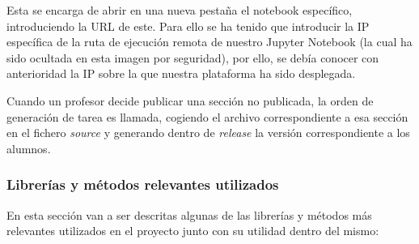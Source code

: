 Esta se encarga de abrir en una nueva pestaña el notebook específico, introduciendo la URL de este. Para ello se ha tenido que introducir la IP específica de la ruta de ejecución remota de nuestro Jupyter Notebook (la cual ha sido ocultada en esta imagen por seguridad), por ello, se debía conocer con anterioridad la IP sobre la que nuestra plataforma ha sido desplegada.

Cuando un profesor decide publicar una sección no publicada, la orden de generación de tarea es llamada, cogiendo el archivo correspondiente a esa sección en el fichero \textit{source} y generando dentro de \textit{release} la versión correspondiente a los alumnos. 


\subsubsection{Librerías y métodos relevantes utilizados}
En esta sección van a ser descritas algunas de las librerías y métodos más relevantes utilizados en el proyecto junto con su utilidad dentro del mismo:
